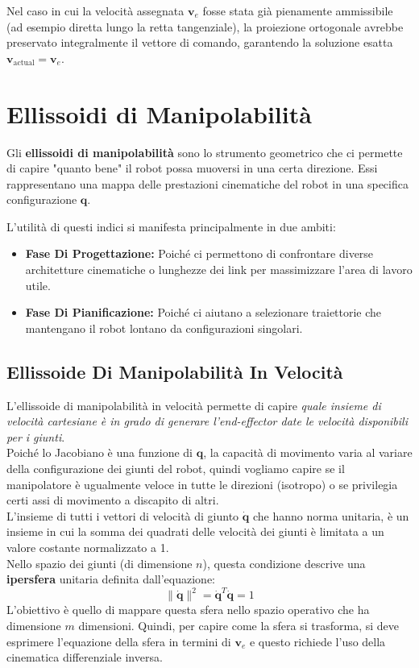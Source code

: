\documentclass[11pt, a4paper]{report}
\begin{document}
Nel caso in cui la velocità assegnata $\bm{v}_e$ fosse stata già pienamente ammissibile (ad esempio diretta lungo la retta tangenziale), la proiezione ortogonale avrebbe preservato integralmente il vettore di comando, garantendo la soluzione esatta $\bm{v}_{\text{actual}} = \bm{v}_e$.

\newpage
\section{Ellissoidi di Manipolabilità}
Gli \textbf{ellissoidi di manipolabilità} sono lo strumento geometrico che ci permette di capire "quanto bene" il robot possa muoversi in una certa direzione. Essi rappresentano una mappa delle prestazioni cinematiche del robot in una specifica configurazione $\bm{q}$.

L'utilità di questi indici si manifesta principalmente in due ambiti:
\begin{itemize}
    \item \textbf{Fase Di Progettazione:} Poiché ci permettono di confrontare diverse architetture cinematiche o lunghezze dei link per massimizzare l'area di lavoro utile.
    \item \textbf{Fase Di Pianificazione:} Poiché ci aiutano a selezionare traiettorie che mantengano il robot lontano da configurazioni singolari.
\end{itemize}

\subsection{Ellissoide Di Manipolabilità In Velocità}
L'ellissoide di manipolabilità in velocità permette di capire \emph{quale insieme di velocità cartesiane è in grado di generare l'end-effector date le velocità disponibili per i giunti}. \\
Poiché lo Jacobiano è una funzione di $\bm{q}$, la capacità di movimento varia al variare della configurazione dei giunti del robot, quindi vogliamo capire se il manipolatore è ugualmente veloce in tutte le direzioni (isotropo) o se privilegia certi assi di movimento a discapito di altri.\\
L'insieme di tutti i vettori di velocità di giunto $\dot{\bm{q}}$ che hanno norma unitaria, è un insieme in cui la somma dei quadrati delle velocità dei giunti è limitata a un valore costante normalizzato a 1.\\
Nello spazio dei giunti (di dimensione \(n\)), questa condizione descrive una \textbf{ipersfera} unitaria definita dall'equazione:
\[
    \|\dot{\bm{q}}\|^2 = \dot{\bm{q}}^T\dot{\bm{q}} = 1
\]
L'obiettivo è quello di mappare questa sfera nello spazio operativo che ha dimensione $m$ dimensioni. Quindi, per capire come la sfera si trasforma, si deve esprimere l'equazione della sfera in termini di $\bm{v}_e$ e questo richiede l'uso della cinematica differenziale inversa.
\end{document}

